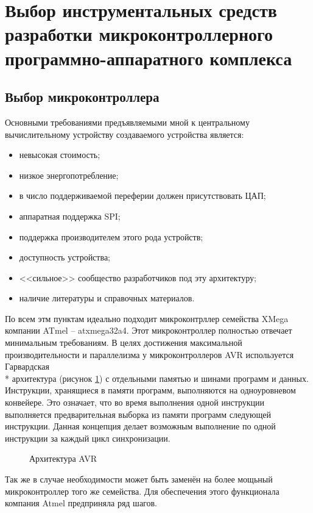 \section{Выбор инструментальных средств разработки микроконтроллерного программно-аппаратного комплекса}

\subsection{Выбор микроконтроллера}
Основными требованиями предъявляемыми мной к центральному вычислительному устройству
создаваемого устройства является:
\begin{itemize}
	\item{} невысокая стоимость;
	\item{} низкое энергопотребление;
	\item{} в число поддерживаемой переферии должен присутствовать ЦАП;
	\item{} аппаратная поддержка SPI;
	\item{} поддержка производителем этого рода устройств;
	\item{} доступность устройства;
	\item{} <<сильное>> сообщество разработчиков под эту архитектуру;
	\item{} наличие литературы и справочных материалов.
\end{itemize}


По всем этм пунктам идеально подходит микроконтрллер семейства XMega компании ATmel -- atxmega32a4.
Этот микроконтроллер полностью отвечает минимальным требованиям. В целях достижения максимальной
производительности и параллелизма у микроконтроллеров AVR используется
Гарвардская\\*
архитектура (рисунок \ref{img:avr_arch}) с отдельными памятью и шинами программ и данных. Инструкции,
хранящиеся в памяти программ, выполняются на одноуровневом конвейере. Это означает, что
во время выполнения одной инструкции выполняется предварительная выборка из памяти программ
следующей инструкции. Данная концепция делает возможным выполнение по одной инструкции за
каждый цикл синхронизации.

\begin{figure}[ht]
	\caption{Архитектура AVR}
	\label{img:avr_arch}
\end{figure}


Так же в случае необходимости может быть заменён на более мощьный микроконтроллер того же семейства.
Для обеспечения этого функционала компания Atmel предприняла ряд шагов.

